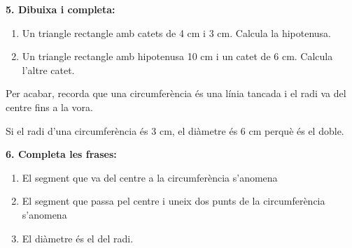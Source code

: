 \documentclass[12pt,a4paper]{article}
\begin{document}
\textbf{5. Dibuixa i completa:}

\begin{enumerate}[label=\alph*)]
    \item Un triangle rectangle amb catets de 4 cm i 3 cm. Calcula la hipotenusa. \vspace{1.2cm}
    \item Un triangle rectangle amb hipotenusa 10 cm i un catet de 6 cm. Calcula l'altre catet. \vspace{1.2cm}
\end{enumerate}

\begin{center}
\end{center}

\begin{capsula}
Per acabar, recorda que una circumferència és una línia tancada i el radi va del centre fins a la vora.
\end{capsula}

\begin{exemple}
Si el radi d'una circumferència és 3 cm, el diàmetre és 6 cm perquè és el doble.
\end{exemple}

\newpage
\textbf{6. Completa les frases:}
\begin{enumerate}[label=\alph*)]
    \item El segment que va del centre a la circumferència s'anomena \dotfill \vspace{0.6cm}
    \item El segment que passa pel centre i uneix dos punts de la circumferència s'anomena \dotfill \vspace{0.6cm}
    \item El diàmetre és el \dotfill del radi. \vspace{0.6cm}
\end{enumerate}

\begin{center}
\end{center}
\end{document}

